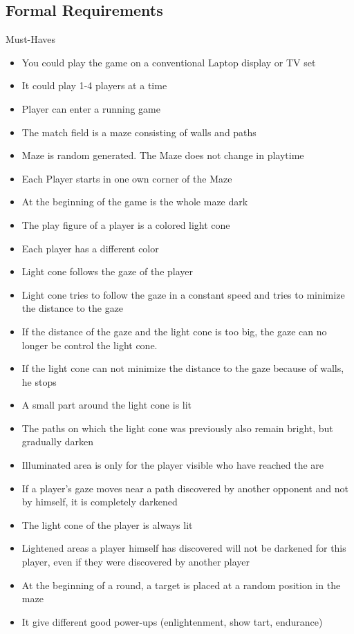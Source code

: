 \documentclass{sigchi}
\begin{document}
\subsection{Formal Requirements}
	Must-Haves
	\begin{itemize}
		\item You could play the game on a conventional Laptop display or TV set
		\item It could play 1-4 players at a time 
		\item Player can enter a running game
		\item The match field is a maze consisting of walls and paths 
		\item Maze is random generated. The Maze does not change in playtime
		\item Each Player starts in one own corner of the Maze
		\item At the beginning of the game is the whole maze dark
		\item The play figure of a player is a colored light cone
		\item Each player has a different color
		\item Light cone follows the gaze of the player
		\item Light cone tries to follow the gaze in a constant speed and tries to minimize the distance to the gaze
		\item If the distance of the gaze and the light cone is too big, the gaze can no longer be control the light cone.
		\item If the light cone can not minimize the distance to the gaze because of walls, he stops
		\item A small part around the light cone is lit
		\item The paths on which the light cone was previously also remain bright, but gradually darken
		\item Illuminated area is only for the player visible who have reached the are
		\item If a player's gaze moves near a path discovered by another opponent and not by himself, it is completely darkened 
		\item The light cone of the player is always lit
		\item Lightened areas a player himself has discovered will not be darkened for this player, even if they were discovered by another player
		\item At the beginning of a round, a target is placed at a random position in the maze
		\item It give different good power-ups (enlightenment, show tart, endurance)
	\end{itemize}
\end{document}
